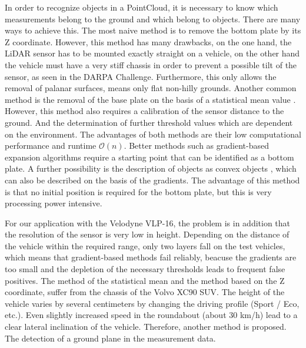 \documentclass[11pt,oneside,openright]{mpreport}
\begin{document}
In order to recognize objects in a PointCloud, it is necessary to know which measurements belong to the ground and which belong to objects.
There are many ways to achieve this. The most naive method is to remove the bottom plate by its Z coordinate.
However, this method has many drawbacks, on the one hand, the LiDAR sensor has to be mounted exactly straight on a vehicle, 
on the other hand the vehicle must have a very stiff chassis in order to prevent a possible tilt of the sensor, as seen in the \ac{DARPA} Challenge.
Furthermore, this only allows the removal of palanar surfaces, means only flat non-hilly grounds. 
Another common method is the removal of the base plate on the basis of a statistical mean value \cite{Zhang}.
However, this method also requires a calibration of the sensor distance to the ground. 
And the determination of further threshold values which are dependent on the environment.
The advantages of both methods are their low computational performance and runtime $\mathcal{O}(n)$.
Better methods such as gradient-based expansion algorithms require a starting point that can be identified as a bottom plate.
A further possibility is the description of objects as convex objects \cite{5164280}, which can also be described on the basis of the gradients.
The advantage of this method is that no initial position is required for the bottom plate, but this is very processing power intensive.
% 

For our application with the Velodyne VLP-16, the problem is in addition that the resolution of the sensor is very low in height.
Depending on the distance of the vehicle within the required range, only two layers fall on the test vehicles, which means that gradient-based methods fail reliably,
beacuse the gradients are too small and the depletion of the necessary thresholds leads to frequent false positives. 
The method of the statistical mean and the method based on the Z coordinate, suffer from the chassis of the Volvo XC90 SUV. 
The height of the vehicle varies by several centimeters by changing the driving profile (Sport / Eco, etc.). Even slightly increased speed in the roundabout (about 30 km/h)
lead to a clear lateral inclination of the vehicle. Therefore, another method is proposed. The detection of a ground plane in the measurement data.
\end{document}
